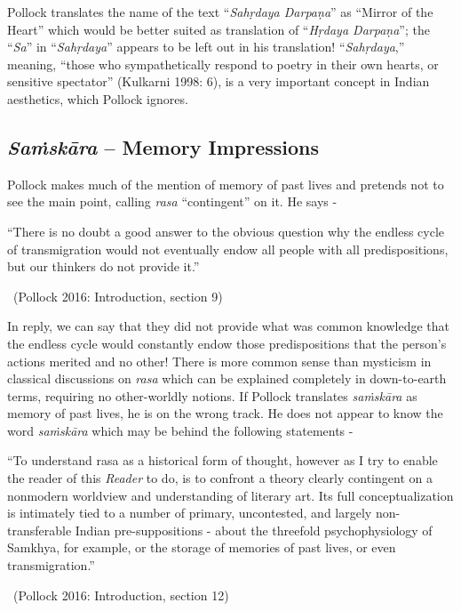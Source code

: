 Pollock translates the name of the text “\textit{Sahṛdaya Darpaṇa}” as “Mirror of the Heart” which would be better suited as translation of “\textit{Hṛdaya Darpaṇa}”; the “\textit{Sa}” in “\textit{Sahṛdaya}” appears to be left out in his translation! “\textit{Sahṛdaya},” meaning, “those who sympathetically respond to poetry in their own hearts, or sensitive spectator” (Kulkarni 1998: 6), is a very important concept in Indian aesthetics, which Pollock ignores.


\newpage

\subsection*{\textit{Saṁskāra} – Memory Impressions}

\vspace{-0.2cm}

Pollock makes much of the mention of memory of past lives and pretends not to see the main point, calling \textit{rasa} “contingent” on it. He says -

\begin{myquote}
“There is no doubt a good answer to the obvious question why the endless cycle of transmigration would not eventually endow all people with all predispositions, but our thinkers do not provide it.” 

~\hfill (Pollock 2016: Introduction, section 9)
\end{myquote}

In reply, we can say that they did not provide what was common knowledge that the endless cycle would constantly endow those predispositions that the person’s actions merited and no other! There is more common sense than mysticism in classical discussions on \textit{rasa} which can be explained completely in down-to-earth terms, requiring no other-worldly notions. If Pollock translates \textit{saṁskāra} as memory of past lives, he is on the wrong track. He does not appear to know the word \textit{saṁskāra} which may be behind the following statements -

\begin{myquote}
“To understand rasa as a historical form of thought, however as I try to enable the reader of this \textit{Reader} to do, is to confront a theory clearly contingent on a nonmodern worldview and understanding of literary art. Its full conceptualization is intimately tied to a number of primary, uncontested, and largely non-transferable Indian pre-suppositions - about the threefold psychophysiology of Samkhya, for example, or the storage of memories of past lives, or even transmigration.” 

~\hfill (Pollock 2016: Introduction, section 12)
\end{myquote}

